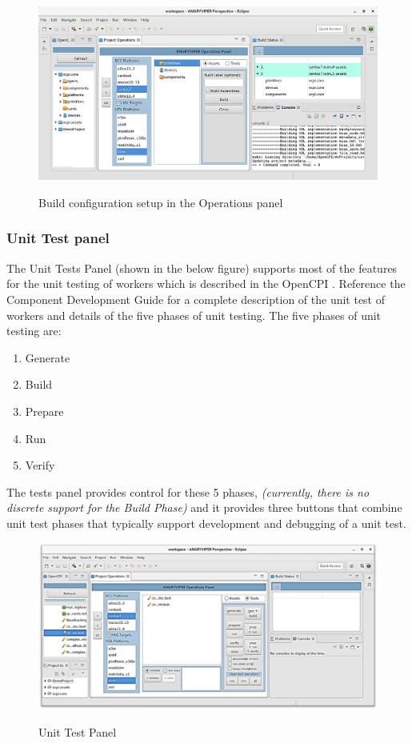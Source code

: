 \documentclass[10pt, a4paper, oneside]{article}
\begin{document}
\begin{figure}[h!]
    \centering
    \caption{Build configuration setup in the Operations panel}

    \includegraphics[width=.95\textwidth]{BuildConfigurationSetup.png}
     \label{fig:Operations panel}
\end{figure}
\subsubsection{Unit Test panel}
The Unit Tests Panel (shown in the below figure) supports most of the features for the unit testing of workers which is described in the OpenCPI .
Reference the Component Development Guide for a complete description of the unit test of workers and details of the five phases of unit testing. The five phases of unit testing are:
\begin{enumerate}
\item Generate
\item Build
\item Prepare
\item Run
\item Verify
\end{enumerate}
The tests panel provides control for these 5 phases, \emph{(currently, there is no discrete support for the Build Phase)} and it provides three buttons that combine unit test phases that typically support development and debugging of a unit test.
\begin{figure}[h!]
    \centering
    \caption{Unit Test Panel}
    \includegraphics[width=.95\textwidth]{UnitTestsPanel.png}
      \label{fig:Unit Test panel}
\end{figure}
\end{document}
